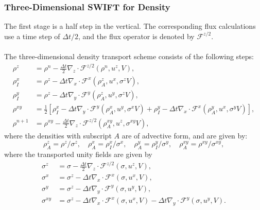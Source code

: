 \documentclass{ametsocV6.1}
\begin{document}
\subsubsection{Three-Dimensional SWIFT for Density} \label{sec:3D_density}
The first stage is a half step in the vertical.
The corresponding flux calculations use a time step of $\Delta t/2$, and the flux operator is denoted by $\mathcal{F}^{z/2}$.
\\
\\
The three-dimensional density transport scheme consists of the following steps:
\begin{subequations}
\begin{align}
\rho^z & = \rho^n - \tfrac{\Delta t}{2}\nabla_z \cdot \mathcal{F}^{z/2}\left(\rho^n, u^z, V \right), \\
\rho_I^x & = \rho^z - \Delta t \nabla_x \cdot \mathcal{F}^x\left(\rho^z_A, u^x, \sigma^z V \right), \\
\rho_I^y & = \rho^z - \Delta t \nabla_y \cdot \mathcal{F}^y\left(\rho^z_A, u^y, \sigma^z V \right), \\
\rho^{xy} & = \frac{1}{2}\left[\rho_I^x - \Delta t \nabla_y \cdot \mathcal{F}^y\left(\rho^x_A, u^y, \sigma^xV \right) + \rho_I^y - \Delta t \nabla_x \cdot \mathcal{F}^x\left(\rho_A^y, u^x,\sigma^yV\right)\right], \\
\rho^{n+1} & = \rho^{xy} - \tfrac{\Delta t}{2}\nabla_z\cdot\mathcal{F}^{z/2}\left(\rho_A^{xy},u^z,\sigma^{xy}V \right),
\end{align}
\end{subequations}
where the densities with subscript $A$ are of advective form, and are given by:
\begin{equation}
\rho^z_A = \rho^z / \sigma^z, \quad
\rho^x_A = \rho_I^x / \sigma^x, \quad
\rho^y_A = \rho_I^y / \sigma^y, \quad
\rho^{xy}_A = \rho^{xy} / \sigma^{xy},
\end{equation}
where the transported unity fields are given by
\begin{subequations}
\begin{align}
\sigma^z & = \sigma - \frac{\Delta t}{2} \nabla_z \cdot \mathcal{F}^{z/2}(\sigma,u^z,V), \\
\sigma^x & = \sigma^z - \Delta{t} \nabla_x \cdot \mathcal{F}^x(\sigma,u^x,V), \\
\sigma^y & = \sigma^z - \Delta{t} \nabla_y \cdot \mathcal{F}^y(\sigma,u^y,V), \\
\sigma^{xy} & = \sigma^z - \Delta{t} \nabla_x \cdot \mathcal{F}^x(\sigma,u^x,V) - \Delta{t} \nabla_y \cdot \mathcal{F}^y(\sigma,u^y,V).
\end{align}
\end{subequations}
\end{document}
